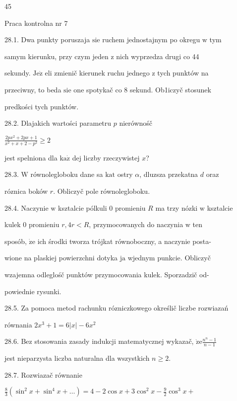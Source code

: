\documentclass[a4paper,12pt]{article}
\begin{document}
45

Praca kontrolna nr 7

28.1. Dwa punkty poruszaja $\mathrm{s}\mathrm{i}\mathrm{e}$ ruchem jednostajnym po okregu $\mathrm{w}$ tym

samym kierunku, przy czym jeden $\mathrm{z}$ nich wyprzedza drugi co 44

sekundy. $\mathrm{J}\mathrm{e}\dot{\mathrm{z}}$ eli zmienič kierunek ruchu jednego $\mathrm{z}$ tych punktów na

przeciwny, to beda $\mathrm{s}\mathrm{i}\mathrm{e}$ one spotykač co 8 sekund. Ob1iczyč stosunek

predkości tych punktów.

28.2. Dlajakich wartości parametru $p$ nierównośč

$\displaystyle \frac{2px^{2}+2px+1}{x^{2}+x+2-p^{2}}\geq 2$

jest spelniona dla $\mathrm{k}\mathrm{a}\dot{\mathrm{z}}$ dej liczby rzeczywistej $x$?

28.3. $\mathrm{W}$ równolegloboku dane sa $\mathrm{k}\mathrm{a}\mathrm{t}$ ostry $\alpha$, dluzsza przekatna $d$ oraz

róznica boków $r$. Obliczyč pole równolegloboku.

28.4. Naczynie $\mathrm{w}$ ksztalcie pólkuli $0$ promieniu $R$ ma trzy nózki $\mathrm{w}$ ksztalcie

kulek $0$ promieniu $r, 4r < R$, przymocowanych do naczynia $\mathrm{w}$ ten

sposób, $\dot{\mathrm{z}}\mathrm{e}$ ich środki tworza trójkat równoboczny, a naczynie posta-

wione na plaskiej powierzchni dotyka $\mathrm{j}\mathrm{a}$ wjednym punkcie. Obliczyč

wzajemna odleglośč punktów przymocowania kulek. Sporzadzič od-

powiednie rysunki.

28.5. Za pomoca metod rachunku rózniczkowego określič liczbe rozwiazań

równania $2x^{3}+1=6|x|-6x^{2}$

28.6. Bez stosowania zasady indukcji matematycznej wykazač, $\dot{\mathrm{z}}\mathrm{e} \displaystyle \frac{n^{n}-1}{n-1}$

jest nieparzysta liczba naturalna dla wszystkich $n\geq 2.$

28.7. Rozwiazač równanie

$\displaystyle \frac{8}{3}(\sin^{2}x+\sin^{4}x+\ldots)=4-2\cos x+3\cos^{2}x-\frac{9}{2}\cos^{3}x+$
\end{document}
